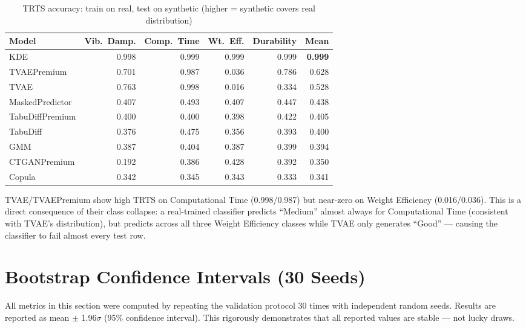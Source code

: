 \documentclass[12pt,a4paper]{article}
\begin{document}
\begin{table}[H]
\centering
\caption{TRTS accuracy: train on real, test on synthetic (higher = synthetic covers real distribution)}
\label{tab:trts}
\renewcommand{\arraystretch}{1.25}
\begin{tabular}{lrrrrr}
\toprule
\textbf{Model} & \textbf{Vib.\ Damp.} & \textbf{Comp.\ Time} & \textbf{Wt.\ Eff.} & \textbf{Durability} & \textbf{Mean} \\
\midrule
KDE             & 0.998 & 0.999 & 0.999 & 0.999 & \textbf{0.999} \\
TVAEPremium     & 0.701 & 0.987 & 0.036 & 0.786 & 0.628 \\
TVAE            & 0.763 & 0.998 & 0.016 & 0.334 & 0.528 \\
MaskedPredictor & 0.407 & 0.493 & 0.407 & 0.447 & 0.438 \\
TabuDiffPremium & 0.400 & 0.400 & 0.398 & 0.422 & 0.405 \\
TabuDiff        & 0.376 & 0.475 & 0.356 & 0.393 & 0.400 \\
GMM             & 0.387 & 0.404 & 0.387 & 0.399 & 0.394 \\
CTGANPremium    & 0.192 & 0.386 & 0.428 & 0.392 & 0.350 \\
Copula          & 0.342 & 0.345 & 0.343 & 0.333 & 0.341 \\
\bottomrule
\end{tabular}
\end{table}

\begin{tcolorbox}[warningbox, title={TVAE TRTS Anomaly}]
TVAE/TVAEPremium show high TRTS on Computational Time (0.998/0.987) but near-zero on Weight Efficiency (0.016/0.036). This is a direct consequence of their class collapse: a real-trained classifier predicts ``Medium'' almost always for Computational Time (consistent with TVAE's distribution), but predicts across all three Weight Efficiency classes while TVAE only generates ``Good'' --- causing the classifier to fail almost every test row.
\end{tcolorbox}

\section{Bootstrap Confidence Intervals (30 Seeds)}

All metrics in this section were computed by repeating the validation protocol 30 times with independent random seeds. Results are reported as mean $\pm$ 1.96$\sigma$ (95\% confidence interval). This rigorously demonstrates that all reported values are stable --- not lucky draws.
\end{document}
